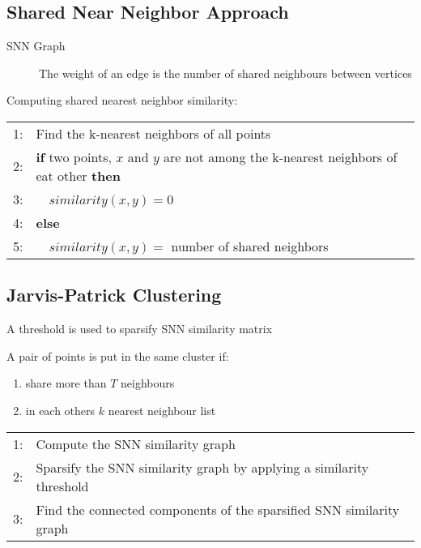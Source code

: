 \subsection{Shared Near Neighbor Approach}
\begin{description}
\item[SNN Graph] The weight of an edge is the number of shared neighbours between vertices
\end{description}
Computing shared nearest neighbor similarity:
\begin{table}[h!]
\begin{tabular}{r p{12cm}}
\hline
    1: & Find the k-nearest neighbors of all points \\
    2: & \textbf{if} two points, $x$ and $y$ are not among the k-nearest neighbors of eat other \textbf{then} \\
    3: & \ \ $similarity(x, y) = 0$ \\
    4: & \textbf{else} \\
    5: & \ \ $similarity(x, y) = $ number of shared neighbors\\
\hline
\end{tabular}
\end{table}


\subsection{Jarvis-Patrick Clustering}

\begin{description}
\item A threshold is used to sparsify SNN similarity matrix
\item A pair of points is put in the same cluster if:
    \begin{enumerate}
        \item share more than $T$ neighbours
        \item in each others $k$ nearest neighbour list
    \end{enumerate}
\end{description}

\begin{table}[h!]
\begin{tabular}{r p{12cm}}
\hline
    1: & Compute the SNN similarity graph \\
    2: & Sparsify the SNN similarity graph by applying a similarity threshold \\
    3: & Find the connected components of the sparsified SNN similarity graph \\
\hline
\end{tabular}
\end{table}

